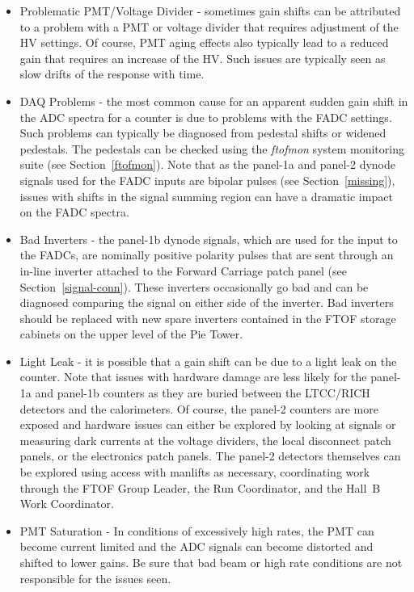\documentclass[12pt]{article}
\begin{document}
\begin{itemize}
\item Problematic PMT/Voltage Divider - sometimes gain shifts can be attributed to a
problem with a PMT or voltage divider that requires adjustment of the HV settings. Of
course, PMT aging effects also typically lead to a reduced gain that requires an increase
of the HV. Such issues are typically seen as slow drifts of the response with time.
\item DAQ Problems - the most common cause for an apparent sudden gain shift in the
ADC spectra for a counter is due to problems with the FADC settings. Such problems
can typically be diagnosed from pedestal shifts or widened pedestals. The pedestals can
be checked using the {\it ftofmon} system monitoring suite (see Section~\ref{ftofmon}).
Note that as the panel-1a and panel-2 dynode signals used for the FADC inputs are bipolar
pulses (see Section~\ref{missing}), issues with shifts in the signal summing region can have
a dramatic impact on the FADC spectra. 
\item Bad Inverters - the panel-1b dynode signals, which are used for the input to the 
FADCs, are nominally positive polarity pulses that are sent through an in-line inverter 
attached to the Forward Carriage patch panel (see Section~\ref{signal-conn}). These 
inverters occasionally go bad and can be diagnosed comparing the signal on either side 
of the inverter. Bad inverters should be replaced with new spare inverters contained in 
the FTOF storage cabinets on the upper level of the Pie Tower.
\item Light Leak - it is possible that a gain shift can be due to a light leak on the 
counter. Note that issues with hardware damage are less likely for the panel-1a and 
panel-1b counters as they are buried between the LTCC/RICH detectors and the 
calorimeters. Of course, the panel-2 counters are more exposed and hardware issues can 
either be explored by looking at signals or measuring dark currents at the voltage 
dividers, the local disconnect patch panels, or the electronics patch panels. The 
panel-2 detectors themselves can be explored using access with manlifts as necessary, 
coordinating work through the FTOF Group Leader, the Run Coordinator, and the Hall~B
Work Coordinator.
\item PMT Saturation - In conditions of excessively high rates, the PMT can become
current limited and the ADC signals can become distorted and shifted to lower gains. Be
sure that bad beam or high rate conditions are not responsible for the issues seen.
\end{itemize}
\end{document}
